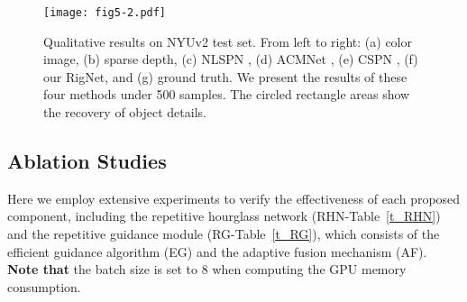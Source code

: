 \documentclass[runningheads]{llncs}
\begin{document}
\begin{figure}[t]
  \centering
  \texttt{[image: fig5-2.pdf]}\\
  \caption{Qualitative results on NYUv2 test set. From left to right: (a) color image, (b) sparse depth, (c) NLSPN \cite{park2020nonlocal}, (d) ACMNet \cite{zhao2021adaptive}, (e) CSPN \cite{2018Learning}, (f) our RigNet, and (g) ground truth. We present the results of these four methods under 500 samples. The circled rectangle areas show the recovery of object details.}\label{Fig.5}
\end{figure}


\begin{table}[t]
\centering
\renewcommand\arraystretch{1.2}
\caption{Ablation studies of RHN on KITTI validation set. \textcolor{blue}{18-1} denotes that we use 1 ResNet-18 as backbone, which is also the baseline. `Deeper'/`More' denotes that we conduct single\&deeper/multiple\&tandem hourglass units as backbone. Note that each layer of RHN only contains two convolutions while the RHN employs ResNet.}
\label{t_RHN}
\end{table}

\subsection{Ablation Studies}
Here we employ extensive experiments to verify the effectiveness of each proposed component, including the repetitive hourglass network (RHN-Table~\ref{t_RHN}) and the repetitive guidance module (RG-Table~\ref{t_RG}), which consists of the efficient guidance algorithm (EG) and the adaptive fusion mechanism (AF). \textbf{Note that} the batch size is set to 8 when computing the GPU memory consumption.
\end{document}
